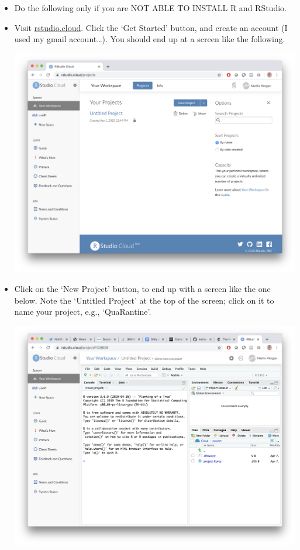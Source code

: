 \documentclass[]{book}
\begin{document}
\begin{itemize}
\item
  Do the following only if you are NOT ABLE TO INSTALL R and RStudio.
\item
  Visit \href{https://rstudio.cloud/}{rstudio.cloud}. Click the `Get Started' button, and create an account (I used my gmail account\ldots{}). You should end up at a screen like the following.

  \includegraphics[width=33.08in]{images/RStudio-cloud-screenshot}
\item
  Click on the `New Project' button, to end up with a screen like the one below. Note the `Untitled Project' at the top of the screen; click on it to name your project, e.g., `QuaRantine'.

  \includegraphics[width=33.08in]{images/RStudio-cloud-project}
\end{itemize}
\end{document}

